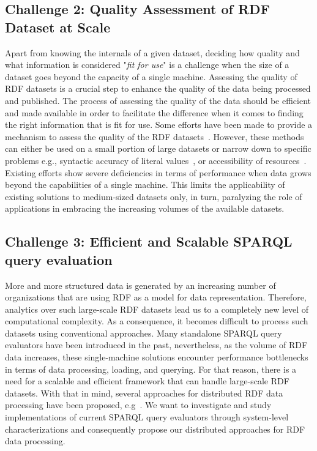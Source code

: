 \subsection{Challenge 2: Quality Assessment of RDF Dataset at Scale}
\label{sec:c2}
Apart from knowing the internals of a given dataset, deciding how quality and what information is considered "\textit{fit for use}" is a challenge when the size of a dataset goes beyond the capacity of a single machine.
Assessing the quality of \gls{RDF} datasets is a crucial step to enhance the quality of the data being processed and published.
The process of assessing the quality of the data should be efficient and made available in order to facilitate the difference when it comes to finding the right information that is fit for use.
Some efforts have been made to provide a mechanism to assess the quality of the \gls{RDF} datasets~\cite{Debattista0AC18,farber2018,beek2018,debattista2016luzzu}.
However, these methods can either be used on a small portion of large datasets \cite{farber2018} or narrow down to specific problems e.g., syntactic accuracy of literal values~\cite{beek2018}, or accessibility of resources~\cite{Mihindukulasooriya2016LDSA}.
Existing efforts show severe deficiencies in terms of performance when data grows beyond the capabilities of a single machine.
This limits the applicability of existing solutions to medium-sized datasets only, in turn, paralyzing the role of applications in embracing the increasing volumes of the available datasets.

\subsection{Challenge 3: Efficient and Scalable SPARQL query evaluation}
\label{sec:c3}
More and more structured data is generated by an increasing number of organizations that are using \gls{RDF} as a model for data representation.
Therefore, analytics over such large-scale \gls{RDF} datasets lead us to a completely new level of computational complexity.
As a consequence, it becomes difficult to process such datasets using conventional approaches.
Many standalone \gls{SPARQL} query evaluators have been introduced in the past, nevertheless, as the volume of \gls{RDF} data increases, these single-machine solutions encounter performance bottlenecks in terms of data processing, loading, and querying.
For that reason, there is a need for a scalable and efficient framework that can handle large-scale \gls{RDF} datasets.
With that in mind, several approaches for distributed \gls{RDF} data processing have been proposed, e.g~\cite{sparqlgx-iswc-2016, Schatzle:2016:SRQ:2977797.2977806}.
We want to investigate and study implementations of current \gls{SPARQL} query evaluators through system-level characterizations and consequently propose our distributed approaches for \gls{RDF} data processing.

